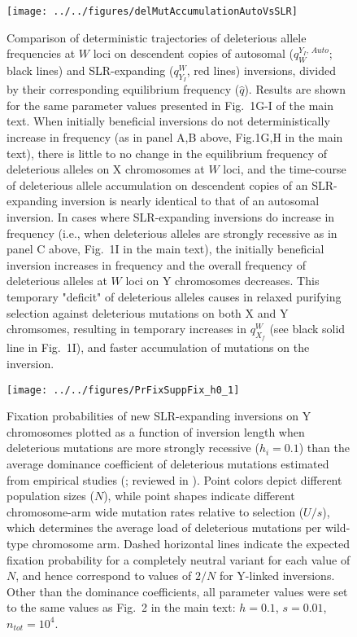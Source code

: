 \documentclass{article}
\begin{document}
\begin{appendices}
 \begin{figure}[htbp]
 \centering
 \texttt{[image: ../../figures/delMutAccumulationAutoVsSLR]}
 \caption{Comparison of deterministic trajectories of deleterious allele frequencies at $W$ loci on descendent copies of autosomal ($q_{W}^{Y_I, \,Auto}$; black lines) and SLR-expanding ($q_{Y_I}^{W}$, red lines) inversions, divided by their corresponding equilibrium frequency ($\hat{q}$). Results are shown for the same parameter values presented in Fig.~1G-I of the main text. When initially beneficial inversions do not deterministically increase in frequency (as in panel A,B above, Fig.1G,H in the main text), there is little to no change in the equilibrium frequency of deleterious alleles on X chromosomes at $W$ loci, and the time-course of deleterious allele accumulation on descendent copies of an SLR-expanding inversion is nearly identical to that of an autosomal inversion. In cases where SLR-expanding inversions do increase in frequency (i.e., when deleterious alleles are strongly recessive as in panel C above, Fig.~1I in the main text), the initially beneficial inversion increases in frequency and the overall frequency of deleterious alleles at $W$ loci on Y chromosomes decreases. This temporary "deficit" of deleterious alleles causes in relaxed purifying selection against deleterious mutations on both X and Y chromsomes, resulting in temporary increases in $q_{X_f}^{W}$ (see black solid line in Fig.~1I), and faster accumulation of mutations on the inversion.
 }
 \label{fig:mutAccumCompareFig}
 \end{figure}



 \begin{figure}[htbp]
 \centering
 \texttt{[image: ../../figures/PrFixSuppFix\_h0\_1]}
 \caption{Fixation probabilities of new SLR-expanding inversions on Y chromosomes plotted as a function of inversion length when deleterious mutations are more strongly recessive ($h_i = 0.1$) than the average dominance coefficient of deleterious mutations estimated from empirical studies (\citealt{Manna2011, AgrawalWhitlock2012, Huber2018}; reviewed in \citealt{Billiard-etal-2021}). Point colors depict different population sizes ($N$), while point shapes indicate different chromosome-arm wide mutation rates relative to selection ($U/s$), which determines the average load of deleterious mutations per wild-type chromosome arm. Dashed horizontal lines indicate the expected fixation probability for a completely neutral variant for each value of $N$, and hence correspond to values of $2/N$ for Y-linked inversions. Other than the dominance coefficients, all parameter values were set to the same values as Fig.~2 in the main text: $h = 0.1$, $s = 0.01$, $n_{tot} = 10^4$.}
 \label{fig:PrFix_lessRecessive}
 \end{figure}



\end{appendices}
\end{document}
